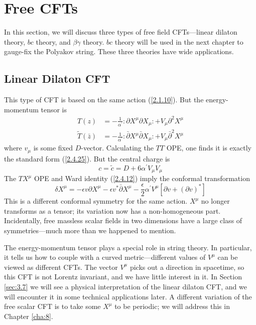 \section{\texorpdfstring{Free CFTs}{2.5 Free CFTs}} \label{sec:2.5}
In this section, we will discuss three types of free field CFTs—linear dilaton theory, $bc$ theory, and $\beta\gamma$ theory. $bc$ theory will be used in the next chapter to gauge-fix the Polyakov string. These three theories have wide applications.    

\subsection*{Linear Dilaton CFT}

This type of CFT is based on the same action (\ref{2.1.10}).    
But the energy-momentum tensor is    
\begin{subequations} \label{2.5.1}
	\begin{align}
		T(z)&=-\frac{1}{\alpha^{\prime}}: \mathrel{\partial X^{\mu} \partial X_{\mu}}:+ V_{\mu} \partial^{2} X^{\mu} \label{2.5.1a} \\
		\tilde{T}(\bar{z})&=-\frac{1}{\alpha^{\prime}}: \mathrel{\bar{\partial} X^{\mu} \bar{\partial} X_{\mu}}:+V_{\mu} \bar{\partial}^{2} X^{\mu}
		\label{2.5.1b}
	\end{align}
\end{subequations}
where $v_\mu$ is some fixed $D$-vector. Calculating the $TT$ OPE, one finds it is exactly the standard form (\ref{2.4.25}).    
But the central charge is    
\begin{equation}
	c=\tilde{c}=D+6 \alpha^{\prime} V_{\mu} V_{\mu}
\end{equation}
The $TX^\mu $ OPE and Ward identity (\ref{2.4.12}) imply the conformal transformation    
\begin{equation}
	\delta X^{\mu}=-\epsilon v \partial X^{\mu}-\epsilon v^{*} \bar{\partial} X^{\mu}-\frac{\epsilon}{2} \alpha^{\prime} V^{\mu}\left[\partial v+(\partial v)^{*}\right]
\end{equation}
This is a different conformal symmetry for the same action.    
$X^\mu$ no longer transforms as a tensor; its variation now has a non-homogeneous part. Incidentally, free massless scalar fields in two dimensions have a large class of symmetries—much more than we happened to mention.    

The energy-momentum tensor plays a special role in string theory. In particular, it tells us how to couple with a curved metric—different values of $V^\mu$ can be viewed as different CFTs. The vector $V^\mu$ picks out a direction in spacetime, so this CFT is not Lorentz invariant, and we have little interest in it. In Section \ref{sec:3.7} we will see a physical interpretation of the linear dilaton CFT, and we will encounter it in some technical applications later. A different variation of the free scalar CFT is to take some $X^\mu$ to be periodic; we will address this in Chapter \ref{cha:8}.    

